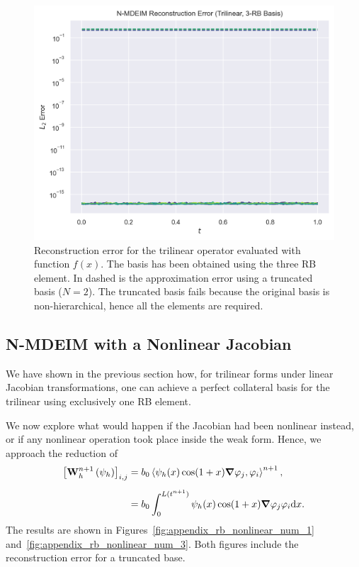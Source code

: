 \documentclass[../../thesis.tex]{subfiles}
\newcommand{\inner}[2]{\left<#1, #2\right>}
\newcommand{\Ah}[1]{\ensuremath{\vb{#1}^{n+1}_h}}
\begin{document}
\begin{figure}[h]
    \includegraphics[width=\columnwidth]{research_project/piston/figures/svd_fourier/trilinear_nonlinear/rb_basis_mdeim_errors_trilinear_num_3.png}
    \caption{Reconstruction error for the trilinear operator evaluated with function $f(x)$.
    The basis has been obtained using the three RB element.
    In dashed is the approximation error using a truncated basis ($N=2$). 
    The truncated basis fails because the original basis is non-hierarchical, 
    hence all the elements are required.}
    \label{fig:appendix_rb_trilinear_num_3}
\end{figure}

\subsection{N-MDEIM with a Nonlinear Jacobian}
We have shown in the previous section how, 
for trilinear forms under linear Jacobian transformations, 
one can achieve a perfect collateral basis for the trilinear using exclusively one RB element.

We now explore what would happen if the Jacobian had been nonlinear instead,
or if any nonlinear operation took place inside the weak form.
Hence, we approach the reduction of
\begin{equation}
    \begin{split}
        \qty[\Ah{W}\left(\psi_{h}\right)]_{i,j}
        &= b_0 \inner{\psi_h(x) \cos(1+x) \grad \varphi_j}{\varphi_i}^{n+1},
        \\[2mm]
        &= b_0 \int_{0}^{L(t^{n+1})} \psi_h(x) \cos(1+x) \grad \varphi_j \varphi_i \dd x.
    \end{split}
\end{equation}
The results are shown in Figures~\ref{fig:appendix_rb_nonlinear_num_1} 
and~\ref{fig:appendix_rb_nonlinear_num_3}.
Both figures include the reconstruction error for a truncated base.
\end{document}
